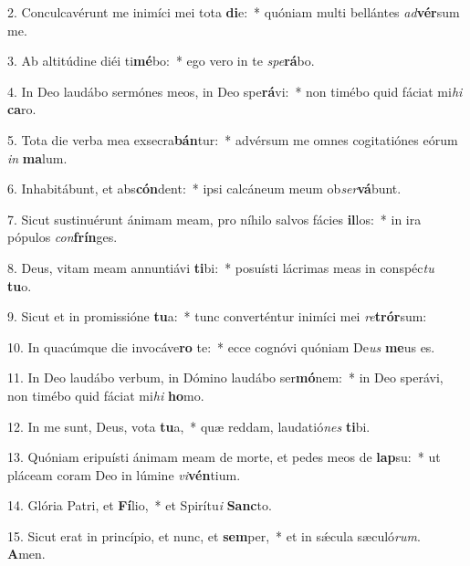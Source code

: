 2. Conculcavérunt me inimíci mei tota \textbf{di}e:~*  quóniam multi bellántes \textit{ad}\textbf{vér}sum me.\

3. Ab altitúdine diéi ti\textbf{mé}bo:~*  ego vero in te \textit{spe}\textbf{rá}bo.\

4. In Deo laudábo sermónes meos, in Deo spe\textbf{rá}vi:~*  non timébo quid fáciat mi\textit{hi} \textbf{ca}ro.\

5. Tota die verba mea exsecra\textbf{bán}tur:~*  advérsum me omnes cogitatiónes eórum \textit{in} \textbf{ma}lum.\

6. Inhabitábunt, et abs\textbf{cón}dent:~*  ipsi calcáneum meum ob\textit{ser}\textbf{vá}bunt.\

7. Sicut sustinuérunt ánimam meam, pro níhilo salvos fácies \textbf{il}los:~*  in ira pópulos \textit{con}\textbf{frín}ges.\

8. Deus, vitam meam annuntiávi \textbf{ti}bi:~*  posuísti lácrimas meas in conspéc\textit{tu} \textbf{tu}o.\

9. Sicut et in promissióne \textbf{tu}a:~*  tunc converténtur inimíci mei \textit{re}\textbf{trór}sum:\

10. In quacúmque die invocáve\textbf{ro} te:~*  ecce cognóvi quóniam De\textit{us} \textbf{me}us es.\

11. In Deo laudábo verbum, in Dómino laudábo ser\textbf{mó}nem:~*  in Deo sperávi, non timébo quid fáciat mi\textit{hi} \textbf{ho}mo.\

12. In me sunt, Deus, vota \textbf{tu}a,~*  quæ reddam, laudatió\textit{nes} \textbf{ti}bi.\

13. Quóniam eripuísti ánimam meam de morte, et pedes meos de \textbf{lap}su:~*  ut pláceam coram Deo in lúmine \textit{vi}\textbf{vén}tium.\

14. Glória Patri, et \textbf{Fí}lio,~*  et Spirítu\textit{i} \textbf{Sanc}to.\

15. Sicut erat in princípio, et nunc, et \textbf{sem}per,~*  et in sǽcula sæculó\textit{rum}. \textbf{A}men.\

